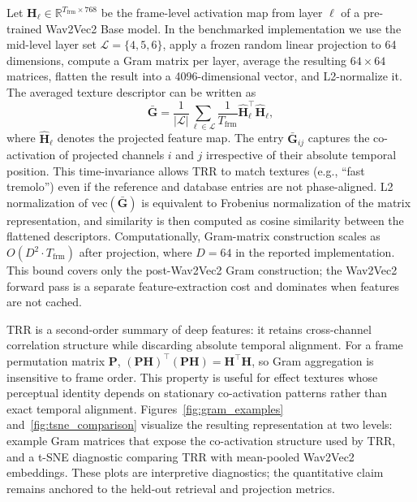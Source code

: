Let $\mathbf{H}_{\ell} \in \mathbb{R}^{T_{\text{frm}} \times 768}$ be the frame-level activation map from layer $\ell$ of a pre-trained Wav2Vec2 Base model. In the benchmarked implementation we use the mid-level layer set $\mathcal{L}=\{4,5,6\}$, apply a frozen random linear projection to 64 dimensions, compute a Gram matrix per layer, average the resulting $64\times 64$ matrices, flatten the result into a 4096-dimensional vector, and L2-normalize it. The averaged texture descriptor can be written as
\begin{equation}
		\bar{\mathbf{G}} = \frac{1}{|\mathcal{L}|}\sum_{\ell\in\mathcal{L}} \frac{1}{T_{\text{frm}}}\widehat{\mathbf{H}}_{\ell}^{\top}\widehat{\mathbf{H}}_{\ell},
\end{equation}
where $\widehat{\mathbf{H}}_{\ell}$ denotes the projected feature map. The entry $\bar{\mathbf{G}}_{ij}$ captures the co-activation of projected channels $i$ and $j$ irrespective of their absolute temporal position. This time-invariance allows TRR to match textures (e.g., ``fast tremolo'') even if the reference and database entries are not phase-aligned. L2 normalization of $\mathrm{vec}(\bar{\mathbf{G}})$ is equivalent to Frobenius normalization of the matrix representation, and similarity is then computed as cosine similarity between the flattened descriptors. Computationally, Gram-matrix construction scales as $O(D^2 \cdot T_{\text{frm}})$ after projection, where $D=64$ in the reported implementation. This bound covers only the post-Wav2Vec2 Gram construction; the Wav2Vec2 forward pass is a separate feature-extraction cost and dominates when features are not cached.

TRR is a second-order summary of deep features: it retains cross-channel correlation structure while discarding absolute temporal alignment. For a frame permutation matrix $\mathbf{P}$, $(\mathbf{P}\mathbf{H})^\top(\mathbf{P}\mathbf{H})=\mathbf{H}^\top\mathbf{H}$, so Gram aggregation is insensitive to frame order. This property is useful for effect textures whose perceptual identity depends on stationary co-activation patterns rather than exact temporal alignment. Figures~\ref{fig:gram_examples} and~\ref{fig:tsne_comparison} visualize the resulting representation at two levels: example Gram matrices that expose the co-activation structure used by TRR, and a t-SNE diagnostic comparing TRR with mean-pooled Wav2Vec2 embeddings. These plots are interpretive diagnostics; the quantitative claim remains anchored to the held-out retrieval and projection metrics.

